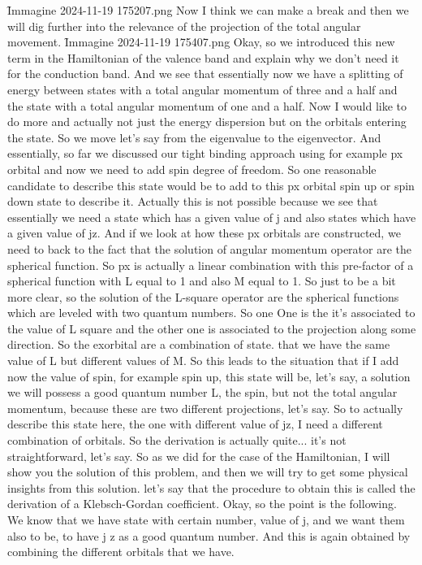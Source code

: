 \f{Immagine 2024-11-19 175207.png}
Now I think we can make a break and then we will dig further into the relevance of the projection of the total angular movement.
\f{Immagine 2024-11-19 175407.png}
Okay, so we introduced this new term in the Hamiltonian of the valence band and explain why we don't need it for the conduction band. And we see that essentially now we have a splitting of energy between states with a total angular momentum of three and a half and the state with a total angular momentum of one and a half. Now I would like to do more and actually not just the energy dispersion but on the orbitals entering the state. So we move let's say from the eigenvalue to the eigenvector. And essentially, so far we discussed our tight binding approach using for example px orbital and now we need to add spin degree of freedom. So one reasonable candidate to describe this state would be to add to this px orbital spin up or spin down state to describe it. Actually this is not possible because we see that essentially we need a state which has a given value of j and also states which have a given value of jz. And if we look at how these px orbitals are constructed, we need to back to the fact that the solution of angular momentum operator are the spherical function. So px is actually a linear combination with this pre-factor of a spherical function with L equal to 1 and also M equal to 1. So just to be a bit more clear, so the solution of the L-square operator are the spherical functions which are leveled with two quantum numbers. So one One is the it's associated to the value of L square and the other one is associated to the projection along some direction. So the exorbital are a combination of state. that we have the same value of L but different values of M. So this leads to the situation that if I add now the value of spin, for example spin up, this state will be, let's say, a solution we will possess a good quantum number L, the spin, but not the total angular momentum, because these are two different projections, let's say. So to actually describe this state here, the one with different value of jz, I need a different combination of orbitals. So the derivation is actually quite... it's not straightforward, let's say. So as we did for the case of the Hamiltonian, I will show you the solution of this problem, and then we will try to get some physical insights from this solution. let's say that the procedure to obtain this is called the derivation of a Klebsch-Gordan coefficient. Okay, so the point is the following. We know that we have state with certain number, value of j, and we want them also to be, to have j z as a good quantum number. And this is again obtained by combining the different orbitals that we have.
